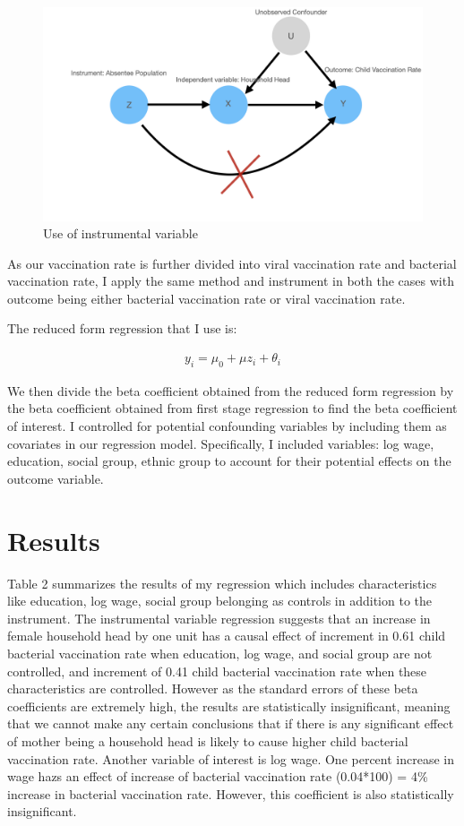 \documentclass[12pt]{article}
\begin{document}
\begin{figure}[H]
    \centering
    \includegraphics[width=1.0\textwidth]{iv_model.001.jpeg}
    \caption{Use of instrumental variable}
    \label{Table of Summary Statistics}
\end{figure}

As our vaccination rate is further divided into viral vaccination rate and bacterial vaccination rate, I apply the same method and instrument in both the cases with outcome being either bacterial vaccination rate or viral vaccination rate.

The reduced form regression that I use is:

\begin{align}
    y_i = \mu_0 + \mu z_i + \theta_i
\end{align}


We then divide the beta coefficient obtained from the reduced form regression by the beta coefficient obtained from first stage regression to find the beta coefficient of interest. I controlled for potential confounding variables by including them as covariates in our regression model. Specifically, I included variables: log wage, education, social group, ethnic group to account for their potential effects on the outcome variable.

\section{Results}
Table 2 summarizes the results of my regression which includes characteristics like education, log wage, social group belonging as controls in addition to the instrument. The instrumental variable regression suggests that an increase in female household head by one unit has a causal effect of increment in 0.61 child bacterial vaccination rate when education, log wage, and social group are not controlled, and increment of 0.41 child bacterial vaccination rate when these characteristics are controlled. However as the standard errors of these beta coefficients are extremely high, the results are statistically insignificant, meaning that we cannot make any certain conclusions that if there is any significant effect of mother being a household head is likely to cause higher child bacterial vaccination rate.
Another variable of interest is log wage. One percent increase in wage hazs an effect of increase of bacterial vaccination rate (0.04*100) = 4\% increase in bacterial vaccination rate. However, this coefficient is also statistically insignificant.
\end{document}

